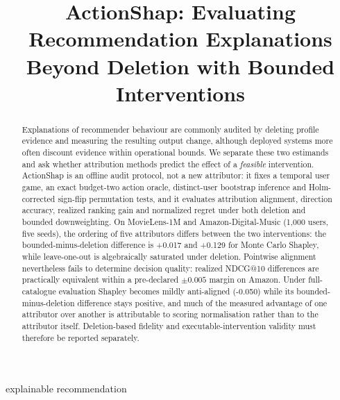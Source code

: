 \begin{frontmatter}
\title{ActionShap: Evaluating Recommendation Explanations Beyond Deletion with Bounded Interventions}
\begin{abstract}
Explanations of recommender behaviour are commonly audited by deleting profile evidence and measuring the resulting output change, although deployed systems more often discount evidence within operational bounds. We separate these two estimands and ask whether attribution methods predict the effect of a \emph{feasible} intervention. ActionShap is an offline audit protocol, not a new attributor: it fixes a temporal user game, an exact budget-two action oracle, distinct-user bootstrap inference and Holm-corrected sign-flip permutation tests, and it evaluates attribution alignment, direction accuracy, realized ranking gain and normalized regret under both deletion and bounded downweighting. On MovieLens-1M and Amazon-Digital-Music (1,000 users, five seeds), the ordering of five attributors differs between the two interventions: the bounded-minus-deletion difference is +0.017 and +0.129 for Monte Carlo Shapley, while leave-one-out is algebraically saturated under deletion. Pointwise alignment nevertheless fails to determine decision quality: realized NDCG@10 differences are practically equivalent within a pre-declared $\pm0.005$ margin on Amazon. Under full-catalogue evaluation Shapley becomes mildly anti-aligned (-0.050) while its bounded-minus-deletion difference stays positive, and much of the measured advantage of one attributor over another is attributable to scoring normalisation rather than to the attributor itself. Deletion-based fidelity and executable-intervention validity must therefore be reported separately.
\end{abstract}

\begin{keyword}\sepword
\sepword
{explainable recommendation}
\end{keyword}
\end{frontmatter}

